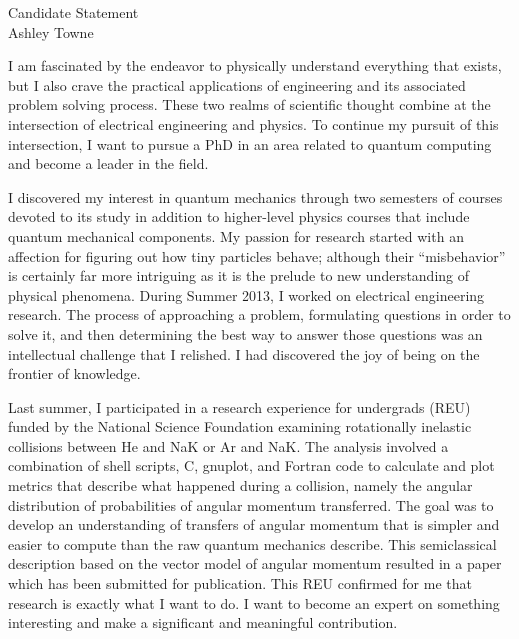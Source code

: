 \setlength{\oddsidemargin}{0in}
\setlength{\evensidemargin}{0in}
\setlength{\textwidth}{6.5in}
\setlength{\topmargin}{-.3in}
\setlength{\textheight}{9in}
\pagestyle{empty}



\begin{center}
{\Large Candidate Statement} \\[.3in]
{\large Ashley Towne}
\end{center}

\vspace*{.5in}
{I am fascinated by the endeavor to physically understand everything that
    exists, but I also crave the practical applications of engineering and its
    associated problem solving process. These two realms of scientific thought
    combine at the intersection of electrical engineering and physics. To
    continue my pursuit of this intersection, I want to pursue a PhD in an area
    related to quantum computing and become a leader in the field. 

    I discovered my interest in quantum mechanics through two semesters of
    courses devoted to its study in addition to higher-level physics courses
    that include quantum mechanical components. My passion for research started
    with an affection for figuring out how tiny particles behave; although
    their “misbehavior” is certainly far more intriguing as it is the prelude
    to new understanding of physical phenomena. During Summer 2013, I worked on
    electrical engineering research. The process of approaching a problem,
    formulating questions in order to solve it, and then determining the best
    way to answer those questions was an intellectual challenge that I
    relished. I had discovered the joy of being on the frontier of knowledge.

    Last summer, I participated in a research experience for undergrads (REU)
    funded by the National Science Foundation examining rotationally inelastic
    collisions between He and NaK or Ar and NaK. The analysis involved a
    combination of shell scripts, C, gnuplot, and Fortran code to calculate and
    plot metrics that describe what happened during a collision, namely the
    angular distribution of probabilities of angular momentum transferred.  The
    goal was to develop an understanding of transfers of angular momentum that
    is simpler and easier to compute than the raw quantum mechanics describe.
    This semiclassical description based on the vector model of angular
    momentum resulted in a paper which has been submitted for publication.
    This REU confirmed for me that research is exactly what I want to do.  I
    want to become an expert on something interesting and make a significant
    and meaningful contribution.

}
